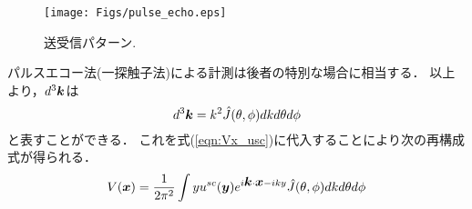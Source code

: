 \begin{figure}[h]
	\begin{center}
	\texttt{[image: Figs/pulse\_echo.eps]} 
	\end{center}
	\caption{送受信パターン.} 
	\label{fig:}
\end{figure}
パルスエコー法(一探触子法)による計測は後者の特別な場合に相当する．
以上より，$d^3\mbox{\boldmath $k$}$は
\begin{equation}
	d^3\mbox{\boldmath $k$}=k^2\hat{J}(\theta,\phi) dkd\theta d\phi
	\label{eqn:}
\end{equation}
と表すことができる．
これを式(\ref{eqn:Vx_usc})に代入することにより次の再構成式が得られる．
\begin{equation}
	V(\mbox{\boldmath $x$}) =\frac{1}{2\pi^2} \int yu^{sc}(\mbox{\boldmath $y$})
	e^{i\mbox{\boldmath $k$}\cdot \mbox{\boldmath $x$}-iky}
	\hat{J}(\theta,\phi) dkd\theta d\phi
	\label{eqn:}
\end{equation}

